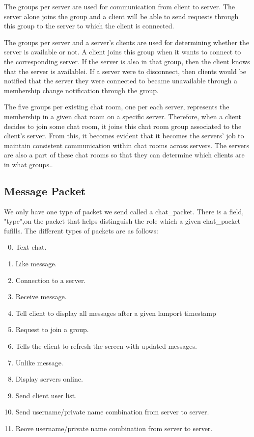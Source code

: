 \documentclass[12pt,journal,compsoc]{IEEEtran}
\begin{document}
The groups per server are used for communication from client to server. The server alone joins the group and a client will be able to send requests through this group to the server to which the client is connected.

The groups per server and a server's clients are used for determining whether the server is available or not. A client joins this group when it wants to connect to the corresponding server. If the server is also in that group, then the client knows that the server is availablei. If a server were to disconnect, then clients would be notified that the server they were connected to became unavailable through a membership change notification through the group.

The five groups per existing chat room, one per each server, represents the membership in a given chat room on a specific server. Therefore, when a client decides to join some chat room, it joins this chat room group associated to the client's server. From this, it becomes evident that it becomes the servers' job to maintain consistent communication within chat rooms across servers. The servers are also a part of these chat rooms so that they can determine which clients are in what groups..


\subsection{Message Packet}

We only have one type of packet we send called a chat\_packet. There is a field, "type",on the packet that helps distinguish the role which a given chat\_packet fufills. The different types of packets are as follows:

\begin{enumerate}
\setcounter{enumi}{-1}
\item Text chat.
\item Like message.
\item Connection to a server.
\item Receive message.
\item Tell client to display all messages after a given lamport timestamp
\item Request to join a group.
\item Tells the client to refresh the screen with updated messages.
\item Unlike message.
\item Display servers online.
\item Send client user list.
\item Send username/private name combination from server to server.
\item Reove username/private name combination from server to server.
\end{enumerate}
\end{document}

